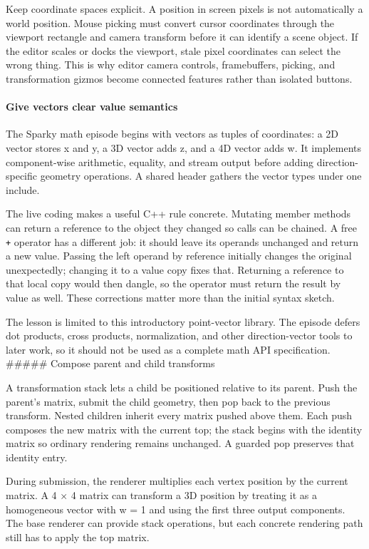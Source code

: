 Keep coordinate spaces explicit. A position in screen pixels is not automatically a world position. Mouse picking must convert cursor coordinates through the viewport rectangle and camera transform before it can identify a scene object. If the editor scales or docks the viewport, stale pixel coordinates can select the wrong thing. This is why editor camera controls, framebuffers, picking, and transformation gizmos become connected features rather than isolated buttons.

\paragraph{Give vectors clear value semantics}\label{06-engine-ii-ch025-give-vectors-clear-value-semantics}

The Sparky math episode begins with vectors as tuples of coordinates: a 2D vector stores x and y, a 3D vector adds z, and a 4D vector adds w. It implements component-wise arithmetic, equality, and stream output before adding direction-specific geometry operations. A shared header gathers the vector types under one include.

The live coding makes a useful C++ rule concrete. Mutating member methods can return a reference to the object they changed so calls can be chained. A free \texttt{+} operator has a different job: it should leave its operands unchanged and return a new value. Passing the left operand by reference initially changes the original unexpectedly; changing it to a value copy fixes that. Returning a reference to that local copy would then dangle, so the operator must return the result by value as well. These corrections matter more than the initial syntax sketch.

The lesson is limited to this introductory point-vector library. The episode defers dot products, cross products, normalization, and other direction-vector tools to later work, so it should not be used as a complete math API specification. \#\#\#\#\# Compose parent and child transforms

A transformation stack lets a child be positioned relative to its parent. Push the parent's matrix, submit the child geometry, then pop back to the previous transform. Nested children inherit every matrix pushed above them. Each push composes the new matrix with the current top; the stack begins with the identity matrix so ordinary rendering remains unchanged. A guarded pop preserves that identity entry.

During submission, the renderer multiplies each vertex position by the current matrix. A 4 × 4 matrix can transform a 3D position by treating it as a homogeneous vector with w = 1 and using the first three output components. The base renderer can provide stack operations, but each concrete rendering path still has to apply the top matrix.

